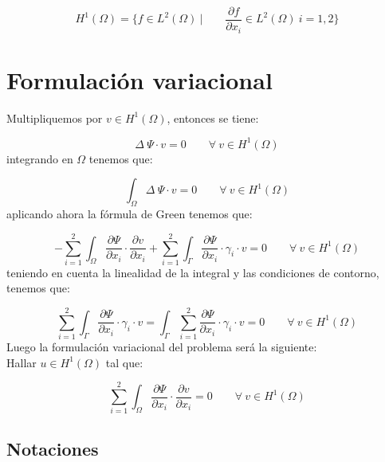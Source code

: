 \documentclass[a4paper,11pt]{article}
\begin{document}
\begin{displaymath}
H^1(\Omega )=\{ f \in L^2(\Omega )\ |\qquad \frac{\partial f}{\partial x_i}
\in L^2(\Omega )\ i=1,2 \}
\end{displaymath}

\section{Formulaci\'on variacional}

Multipliquemos por $v\in H^1(\Omega )$, entonces se tiene:

\begin{displaymath}
\Delta \ \Psi \cdot v = 0\qquad \forall \ v \in H^1(\Omega )
\end{displaymath}
integrando en $\Omega $ tenemos que:

\begin{displaymath}
\int_{\Omega }\Delta \ \Psi \cdot v = 0 \qquad \forall \ v \in H^1(\Omega )
\end{displaymath}
aplicando ahora la f\'ormula de Green tenemos que:

\begin{displaymath}
-\sum_{i=1}^2 \int_{\Omega } \frac{\partial \Psi}{\partial x_i}\cdot
\frac{\partial v}{\partial x_i}+\sum_{i=1}^2\int_{\Gamma }
\frac{\partial \Psi }{\partial x_i}\cdot \gamma_i \cdot v = 0\qquad \forall \
v \in H^1(\Omega )
\end{displaymath}
teniendo en cuenta la linealidad de la integral y las condiciones de contorno,
tenemos que:

\begin{displaymath}
\sum_{i=1}^2\int_{\Gamma }\frac{\partial \Psi}{\partial x_i}\cdot \gamma_i
\cdot v = \int_{\Gamma} \sum_{i=1}^2 \frac{\partial \Psi}{\partial x_i}\cdot
\gamma_i \cdot v = 0\qquad \forall \ v \in H^1(\Omega )
\end{displaymath}
Luego la formulaci\'on variacional del problema ser\'a la siguiente:\\

Hallar $u\in H^1(\Omega )$ tal que:

\begin{displaymath}
\sum_{i=1}^2 \int_{\Omega } \frac{\partial \Psi}{\partial x_i}\cdot
\frac{\partial v}{\partial x_i} = 0\qquad \forall \ v \in H^1(\Omega )
\end{displaymath}

\newpage

\subsection{Notaciones}
\end{document}

